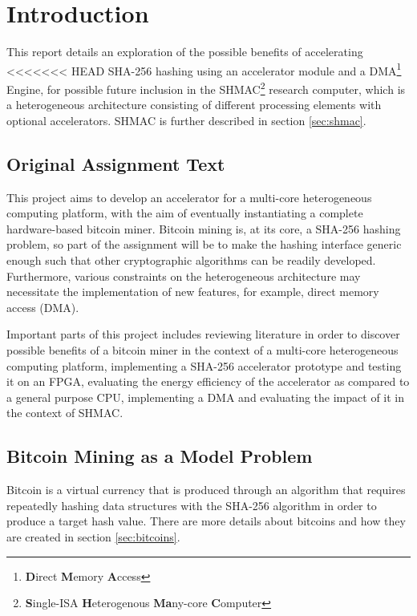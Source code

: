 \chapter{Introduction}

This report details an exploration of the possible benefits of accelerating
<<<<<<< HEAD
SHA-256 hashing using an accelerator module and a DMA\footnote{\textbf{D}irect \textbf{M}emory
\textbf{A}ccess} Engine, for possible future inclusion in the SHMAC\footnote{\textbf{S}ingle-ISA \textbf{H}eterogenous \textbf{Ma}ny-core \textbf{C}omputer} research computer, which is a
heterogeneous architecture consisting of different processing elements with
optional accelerators. SHMAC is further described in section \ref{sec:shmac}.

\section{Original Assignment Text}

This project aims to develop an accelerator for a multi-core heterogeneous
computing platform, with the aim of eventually instantiating a complete hardware-based bitcoin miner.
Bitcoin mining is, at its core, a SHA-256 hashing problem, so part of the
assignment will be to make the hashing interface generic enough such that other
cryptographic algorithms can be readily developed. Furthermore, various constraints
on the heterogeneous architecture may necessitate the implementation of new
features, for example, direct memory access (DMA).

Important parts of this project includes reviewing literature in order to discover
possible benefits of a bitcoin miner in the context of a multi-core heterogeneous
computing platform, implementing a SHA-256 accelerator prototype and testing it on
an FPGA, evaluating the energy efficiency of the accelerator as compared to a
general purpose CPU, implementing a DMA and evaluating the impact of it in the context
of SHMAC.

\section{Bitcoin Mining as a Model Problem}

Bitcoin is a virtual currency that is produced through an algorithm that
requires repeatedly hashing data structures with the SHA-256 algorithm
in order to produce a target hash value. There are more details about
bitcoins and how they are created in section \ref{sec:bitcoins}.

